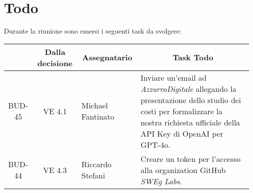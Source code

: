 

\section{Todo}

Durante la riunione sono emersi i seguenti task da svolgere:

\vspace{0.5cm}

\begin{table}[htbp]
\centering
{}
\begin{tabular}{|c|c|p{}|p{}|}
    \hline
    \rowcolor[gray]{0.75}
    \multicolumn{1}{|c|}{\textbf{Codice}} & \multicolumn{1}{|c|}{\textbf{Dalla decisione}} & \multicolumn{1}{|c|}{\textbf{Assegnatario}} & \multicolumn{1}{|c|}{\textbf{Task Todo}} \\
    \hline
    BUD-45 & VE 4.1 & Michael Fantinato & Inviare un'email ad \emph{AzzurroDigitale} allegando la presentazione dello studio dei costi per formalizzare la nostra richiesta
    ufficiale della API Key di OpenAI per GPT-4o. \\
    \hline
    BUD-44 & VE 4.3 & Riccardo Stefani & Creare un token per l'accesso alla organization GitHub \emph{SWEg Labs}. \\
    \hline
\end{tabular}
\end{table}

